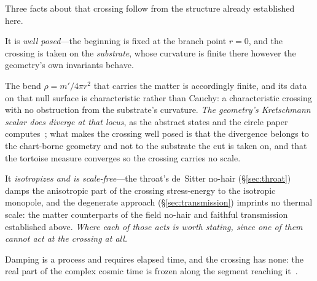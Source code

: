 \documentclass[11pt,a4paper]{article}
\theoremstyle{plain}
\theoremstyle{definition}
\theoremstyle{remark}
\begin{document}
Three facts about that crossing follow from the structure already established here. 

It is \emph{well posed}---the beginning is fixed at the branch point $r=0$, and the crossing is taken on the \emph{substrate}, whose curvature is finite there however the geometry's own invariants behave. 

The bend $\rho=m'/4\pi r^{2}$ that carries the matter is accordingly finite, and its data on that null surface is characteristic rather than Cauchy: a characteristic crossing with no obstruction from the substrate's curvature. \emph{The geometry's Kretschmann scalar does diverge at that locus}, as the abstract states and the circle paper computes~\cite{JanzenCircle}; what makes the crossing well posed is that the divergence belongs to the chart-borne geometry and not to the substrate the cut is taken on, and that the tortoise measure converges so the crossing carries no scale. 

It \emph{isotropizes and is scale-free}---the throat's de~Sitter no-hair (\S\ref{sec:throat}) damps the anisotropic part of the crossing stress-energy to the isotropic monopole, and the degenerate approach (\S\ref{sec:transmission}) imprints no thermal scale: the matter counterparts of the field no-hair and faithful transmission established above. \emph{Where each of those acts is worth stating, since one of them cannot act at the crossing at all.} 

Damping is a process and requires elapsed time, and the crossing has none: the real part of the complex cosmic time is frozen along the segment reaching it~\cite{JanzenCanonicalTime}. 
\end{document}
